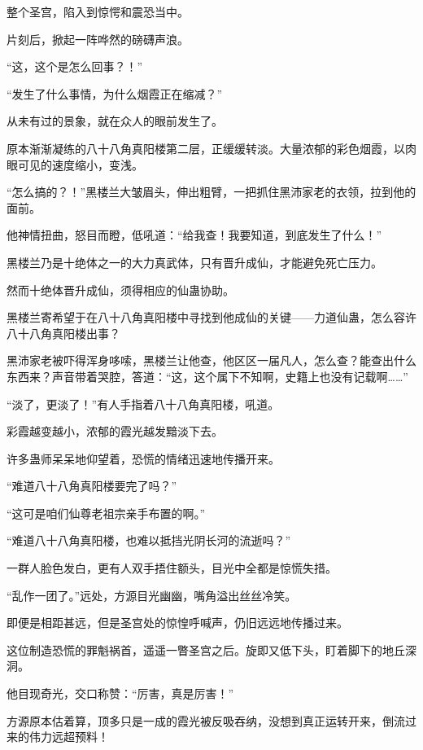 
\begin{this_body}

整个圣宫，陷入到惊愕和震恐当中。

片刻后，掀起一阵哗然的磅礴声浪。

“这，这个是怎么回事？！”

“发生了什么事情，为什么烟霞正在缩减？”

从未有过的景象，就在众人的眼前发生了。

原本渐渐凝练的八十八角真阳楼第二层，正缓缓转淡。大量浓郁的彩色烟霞，以肉眼可见的速度缩小，变浅。

“怎么搞的？！”黑楼兰大皱眉头，伸出粗臂，一把抓住黑沛家老的衣领，拉到他的面前。

他神情扭曲，怒目而瞪，低吼道：“给我查！我要知道，到底发生了什么！”

黑楼兰乃是十绝体之一的大力真武体，只有晋升成仙，才能避免死亡压力。

然而十绝体晋升成仙，须得相应的仙蛊协助。

黑楼兰寄希望于在八十八角真阳楼中寻找到他成仙的关键——力道仙蛊，怎么容许八十八角真阳楼出事？

黑沛家老被吓得浑身哆嗦，黑楼兰让他查，他区区一届凡人，怎么查？能查出什么东西来？声音带着哭腔，答道：“这，这个属下不知啊，史籍上也没有记载啊……”

“淡了，更淡了！”有人手指着八十八角真阳楼，吼道。

彩霞越变越小，浓郁的霞光越发黯淡下去。

许多蛊师呆呆地仰望着，恐慌的情绪迅速地传播开来。

“难道八十八角真阳楼要完了吗？”

“这可是咱们仙尊老祖宗亲手布置的啊。”

“难道八十八角真阳楼，也难以抵挡光阴长河的流逝吗？”

一群人脸色发白，更有人双手捂住额头，目光中全都是惊慌失措。

“乱作一团了。”远处，方源目光幽幽，嘴角溢出丝丝冷笑。

即便是相距甚远，但是圣宫处的惊惶呼喊声，仍旧远远地传播过来。

这位制造恐慌的罪魁祸首，遥遥一瞥圣宫之后。旋即又低下头，盯着脚下的地丘深洞。

他目现奇光，交口称赞：“厉害，真是厉害！”

方源原本估着算，顶多只是一成的霞光被反吸吞纳，没想到真正运转开来，倒流过来的伟力远超预料！


\end{this_body}
